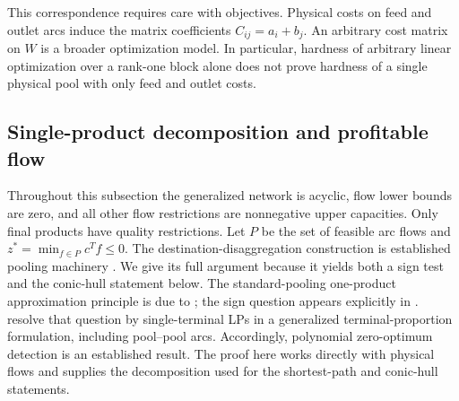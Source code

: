 This correspondence requires care with objectives. Physical costs on
feed and outlet arcs induce the matrix coefficients $C_{ij}=a_i+b_j$.
An arbitrary cost matrix on $W$ is a broader optimization model.
In particular, hardness of arbitrary linear optimization over a
rank-one block alone does not prove hardness of a single physical pool
with only feed and outlet costs.

\subsection{Single-product decomposition and profitable flow}\label{s1:triviality}

Throughout this subsection the generalized network is acyclic, flow
lower bounds are zero, and all other flow restrictions are nonnegative
upper capacities. Only final products have quality restrictions. Let
$P$ be the set of feasible arc flows and $z^*=\min_{f\in P}c^Tf\le0$.
The destination-disaggregation construction is established pooling
machinery \citep{boland2016-new-multi-commodity-flow-formulations}.
We give its full argument because it yields both a sign test and the
conic-hull statement below. The standard-pooling one-product
approximation principle is due to
\citet{dey2015-analysis-of-milp-techniques-for}; the sign question appears
explicitly in \citet[Remark~2.2]{gupte2017-relaxations-and-discretizations-for-the}.
\citet[Proposition~4 and Theorem~2]{xiang2026-dive-and-fix} resolve that
question by single-terminal LPs in a generalized terminal-proportion
formulation, including pool--pool arcs. Accordingly, polynomial
zero-optimum detection is an established result. The proof here works
directly with physical flows and supplies the decomposition used for
the shortest-path and conic-hull statements.

